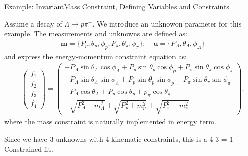 \documentclass[
	xcolor=dvipsnames,
	aspectratio=169,	
	10pt, 
	]{beamer}
\begin{document}
\begin{frame}{Example: InvariantMass Constraint, Defining Variables and Constraints}
	\begin{block}{}
		Assume a decay of $\Lambda\to p\pi^-$. 
		We introduce an unknowon parameter for this example.
		The measurements and unknowns are defined as:
		\begin{align}
			\mathbf{m}=\{P_p,\theta_p,\phi_p,P_\pi,\theta_\pi,\phi_\pi\};\quad\mathbf{u} = \{P_\Lambda,\theta_\Lambda,\phi_\Lambda\}
		\end{align}
		and express the energy-momentum constraint equation as:
		\begin{align}
			\begin{pmatrix}
				f_1\\f_2\\f_3\\f_4
			\end{pmatrix}=
			\begin{pmatrix}
				-P_\Lambda\sin\theta_\Lambda\cos\phi_\Lambda+P_p\sin\theta_p\cos\phi_p+P_\pi\sin\theta_\pi\cos\phi_\pi\\
				-P_\Lambda\sin\theta_\Lambda\sin\phi_\Lambda+P_p\sin\theta_p\sin\phi_p+P_\pi\sin\theta_\pi\sin\phi_\pi\\
				-P_\Lambda\cos\theta_\Lambda+P_p\cos\theta_p+p_\pi\cos\theta_\pi\\
				-\sqrt{P_\Lambda^2+m_\Lambda^2}+\sqrt{P_p^2+m_p^2}+\sqrt{P_\pi^2+m_\pi^2}
			\end{pmatrix}.\label{FMat}
		\end{align}
		where the mass constraint is naturally implemented in energy term.
		
		Since we have 3 unknowns with 4 kinematic constraints, this is a 4-3 = 1-Constrained fit.
	\end{block}
\end{frame}
\end{document}
